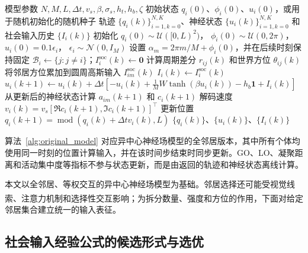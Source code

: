 \documentclass[UTF8,fontset=windows,11pt]{ctexart}
\newcommand{\upcite}[1]{\textsuperscript{\cite{#1}}}
\begin{document}
\begin{algorithm}[!tbp]
 \caption{异中心神经场模型的求解流程}
 \label{alg:original_model}
 \begin{algorithmic}[1]
 \Require 模型参数 $N,M,L,\Delta t,v_s,\beta,\sigma_s,h_t,h_b,\zeta$
 \Require 初始状态 $q_i(0)$、$\phi_i(0)$、$u_i(0)$，或用于随机初始化的随机种子
 \Ensure 轨迹 $\{q_i(k)\}_{i=1,k=0}^{N,K}$、神经状态 $\{u_i(k)\}_{i=1,k=0}^{N,K}$ 和社会输入历史 $\{I_i(k)\}$
 \State 初始化
 $q_i(0)\sim\mathcal U([0,L)^2)$，
 $\phi_i(0)\sim\mathcal U(0,2\pi)$，
 $u_i(0)=0.1\epsilon_i$，
 $\epsilon_i\sim\mathcal N(0,I_M)$
 \State 设置 $\alpha_m=2\pi m/M+\phi_i(0)$，并在后续时刻保持固定
   \State $\mathcal B_i\leftarrow\{j:j\ne i\}$；$I_i^{\mathrm{soc}}(k)\leftarrow\mathbf 0$
    \State 计算周期差分 $r_{ij}(k)$ 和世界方位 $\theta_{ij}(k)$
    \State 将邻居方位累加到圆周高斯输入 $I^{\mathrm{soc}}_{im}(k)$
   \EndFor
   \State $I_i(k)\leftarrow I^{\mathrm{soc}}_{i}(k)$
   \State $u_i(k+1)\leftarrow
   u_i(k)+\Delta t\left[-u_i(k)+\frac{1}{M}W\tanh(\beta u_i(k))-h_b\mathbf 1+I_i(k)\right]$
   \State 从更新后的神经状态计算 $a_{im}(k+1)$ 和 $c_i(k+1)$
   \State 解码速度 $v_i(k)=v_s[\Re c_i(k+1),\Im c_i(k+1)]^\top$
  \EndFor
   \State 更新位置 $q_i(k+1)=\operatorname{mod}(q_i(k)+\Delta t v_i(k),L)$
  \EndFor
 \EndFor
 \State \Return $\{q_i(k)\}$、$\{u_i(k)\}$、$\{I_i(k)\}$
 \end{algorithmic}
\end{algorithm}

算法~\ref{alg:original_model} 对应异中心神经场模型的全邻居版本，其中所有个体均使用同一时刻的位置计算输入，并在该时间步结束时同步更新。GO、LO、凝聚距离和活动集中度等指标不参与状态更新，而是由返回的轨迹和神经状态离线计算。

本文以全邻居、等权交互的异中心神经场模型为基础。邻居选择还可能受视觉线索\upcite{Krongauz2024}、注意力机制\upcite{Li2024}和选择性交互\upcite{Xue2025}影响；为拆分数量、强度和方位的作用，下面对给定邻居集合建立统一的输入表征。


\FloatBarrier
\subsection{社会输入经验公式的候选形式与选优}
\label{sec:social_input_model}
\end{document}
